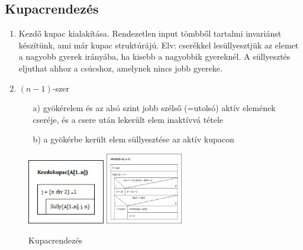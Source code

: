 \documentclass[margin=0px]{article}
\begin{document}
	\subsection{Kupacrendezés}
	
	\begin{enumerate}
		\item Kezdő kupac kialakítása. Rendezetlen input tömbből tartalmi invariánst készítünk, ami már kupac struktúrájú. Elv: cserékkel lesüllyesztjük az elemet a nagyobb gyerek irányába, ha kisebb a nagyobbik gyereknél. A süllyesztés eljuthat ahhoz a csúcshoz, amelynek nincs jobb gyereke.
		\item $(n-1)$-szer
		\begin{itemize}
			\item[a)] gyökérelem és az alsó szint jobb szélső (=utolsó) aktív elemének cseréje, és a csere után lekerült elem inaktívvá tétele
			\item[b)] a gyökérbe került elem süllyesztése az aktív kupacon
		\end{itemize}
	\end{enumerate}	
	\begin{figure}[H]
		\centering
		\includegraphics[width=0.3\textwidth]{img/Kezdokupac.jpg}
		\includegraphics[width=0.3\textwidth]{img/Sully.jpg}

		\caption{Kupacrendezés}
	\end{figure}
	
\end{document}

